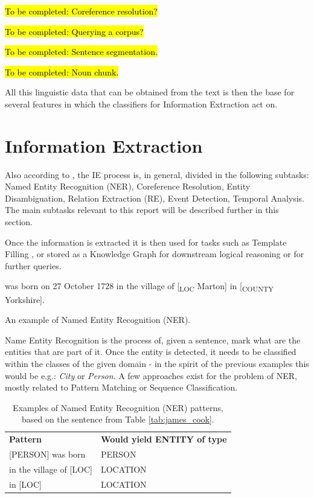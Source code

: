 \documentclass[11pt,a4paper,openright]{memoir}
\begin{document}
\hl{To be completed: Coreference resolution?}

\hl{To be completed: Querying a corpus?}

\hl{To be completed: Sentence segmentation.}

\hl{To be completed: Noun chunk.}

All this linguistic data that can be obtained from the text is then the base for several features in which the classifiers for Information Extraction act on.



%
%
%
%


\section{Information Extraction}

Also according to \cite{Jurafsky:2000:SLP:555733}, the IE process is, in general, divided in the following subtasks: Named Entity Recognition (NER), Coreference Resolution, Entity Disambiguation, Relation Extraction (RE), Event Detection, Temporal Analysis. The main subtasks relevant to this report will be described further in this section.

Once the information is extracted it is then used for tasks such as Template Filling \cite{Jurafsky:2000:SLP:555733}, or stored as a Knowledge Graph for downstream logical reasoning or for further queries.

\begin{table}[!htbp]
  \centering
   was born on 27 October 1728 in the village of [\textsubscript{LOC} Marton] in [\textsubscript{COUNTY} Yorkshire].
  \caption[An example of NER.]{An example of Named Entity Recognition (NER).}
  \label{tab:james_cook}
\end{table}

Name Entity Recognition is the process of, given a sentence, mark what are the entities that are part of it. Once the entity is detected, it needs to be classified within the classes of the given domain - in the spirit of the previous examples this would be e.g.: \emph{City} or \emph{Person}. A few approaches exist for the problem of NER, mostly related to Pattern Matching or Sequence Classification.

\begin{table}[!htbp]
  \centering
    \begin{tabular}{ll}
      \textbf{Pattern}          & \textbf{Would yield ENTITY of type} \\
      {[PERSON]} was born       & PERSON            \\
      in the village of {[LOC]} & LOCATION          \\
      in {[LOC]}                & LOCATION           
    \end{tabular}
  \caption[Patterns for NER.]{Examples of Named Entity Recognition (NER) patterns, based on the sentence from Table \ref{tab:james_cook}.}
  \label{tab:james_cook_patterns}
\end{table}
\end{document}
